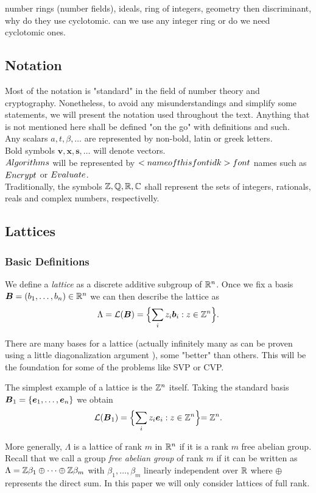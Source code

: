 number rings (number fields), ideals, ring of integers, geometry then discriminant, why do they use cyclotomic. can we use any integer ring or do we need cyclotomic ones.

\subsection{Notation}
Most of the notation is "standard" in the field of number theory and cryptography. Nonetheless, to avoid any misunderstandings and simplify some statements, we will present the notation used throughout the text. Anything that is not mentioned here shall be defined "on the go" with definitions and such. \\

\noindent Any scalars $a, t, \beta, \dots$ are represented by non-bold, latin or greek letters.\\
Bold symbols $\bm{v}, \bm{x}, \bm{s}, \dots$ will denote vectors. \\
$\alg{Algorithms}$ will be represented by $\alg{<name of this font idk> font}$ names such as $\alg{Encrypt}$ or $\alg{Evaluate}$.\\
Traditionally, the symbols $\mathbb{Z}, \mathbb{Q}, \mathbb{R}, \mathbb{C}$ shall represent the sets of integers, rationals, reals and complex numbers, respectivelly.

\subsection{Lattices}
\subsubsection*{Basic Definitions}
We define a \textit{lattice} as a discrete additive subgroup of $\mathbb{R}^n$. Once we fix a basis $\boldsymbol{B} = (b_1, \dots ,b_n) \in \mathbb{R}^n$ we can then describe the lattice as
$$ \Lambda = \mathcal{L}(\boldsymbol{B}) = \Bigl\{ \sum_i z_i \boldsymbol{b}_i : z \in \mathbb{Z}^n \Bigl\}.$$

There are many bases for a lattice (actually infinitely many as can be proven using a little diagonalization argument ), some "better" than others. This will be the foundation for some of the problems like SVP or CVP.

\begin{example}
    The simplest example of a lattice is the $\mathbb{Z}^n$ itself. Taking the standard basis $\boldsymbol{B}_1 = \{\boldsymbol{e}_1, \dots, \boldsymbol{e}_n\}$ we obtain
$$\mathcal{L}(\boldsymbol{B}_1) = \Bigl\{ \sum_i z_i \boldsymbol{e}_i : z \in \mathbb{Z}^n \Bigl\} = \mathbb{Z}^n.$$
\end{example}
More generally, $\Lambda$ is a lattice of rank $m$ in $\mathbb{R}^n$ if it is a rank $m$ free abelian group. Recall that we call a group \textit{free abelian group} of rank $m$ if it can be written as $\Lambda = \mathbb{Z}\beta_1 \oplus \cdots \oplus\mathbb{Z}\beta_m$ with $\beta_1, \dots, \beta_m$ linearly independent over $\mathbb{R}$ where $\oplus$ represents the direct sum. In this paper we will only consider lattices of full rank. 

